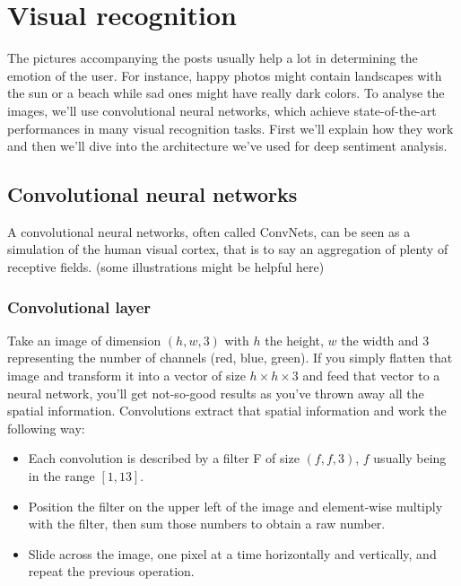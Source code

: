 \chapter{Visual recognition}
The pictures accompanying the posts usually help a lot in determining the emotion of the user. For instance, happy photos might contain landscapes with the sun or a beach while sad ones might have really dark colors. To analyse the images, we'll use convolutional neural networks, which achieve state-of-the-art performances in many visual recognition tasks. First we'll explain how they work and then we'll dive into the architecture we've used for deep sentiment analysis.
\section{Convolutional neural networks}
A convolutional neural networks, often called ConvNets, can be seen as a simulation of the human visual cortex, that is to say an aggregation of plenty of receptive fields. (some illustrations might be helpful here)

\subsection{Convolutional layer}
Take an image of dimension $(h,w,3)$ with $h$ the height, $w$ the width and 3 representing the number of channels (red, blue, green). If you simply flatten that image and transform it into a vector of size $h\times h \times 3$ and feed that vector to a neural network, you'll get not-so-good results as you've thrown away all the spatial information. Convolutions extract that spatial information and work the following way:
\begin{itemize}
\item Each convolution is described by a filter F of size $(f, f, 3)$, $f$ usually being in the range $[1,13]$.
\item Position the filter on the upper left of the image and element-wise multiply with the filter, then sum those numbers to obtain a raw number.
\item Slide across the image, one pixel at a time horizontally and vertically, and repeat the previous operation.
\end{itemize}

